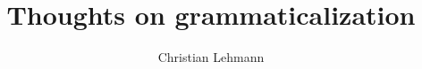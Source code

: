 \title{Thoughts on grammaticalization}
\subtitle{}
\BackBody{}
\dedication{}
\typesetter{}
\proofreader{}
\author{Christian Lehmann}
\newlength{\csspine} 
\newlength{\bodspine}
\setlength{\csspine}{27.0559784mm} %
\setlength{\bodspine}{40mm} %
\newcommand{\lsSeriesColor}{lsRed}
\newcommand{\lsSeriesTitle}{Classics~1}
\renewcommand{\lsISBN}{}                     
\renewcommand{\lsSeries}{tbls} %
\renewcommand{\lsSeriesNumber}{1} %
\renewcommand{\lsURL}{http://langsci-press.org/catalog/book/-1} %